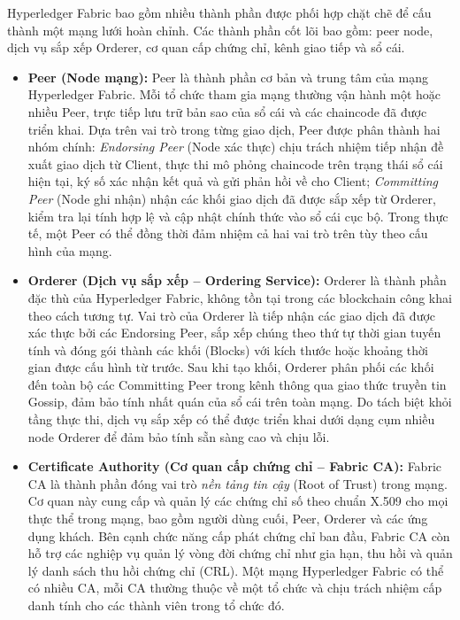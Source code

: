 Hyperledger Fabric bao gồm nhiều thành phần được phối hợp chặt chẽ để cấu thành một mạng lưới hoàn chỉnh. Các thành phần cốt lõi bao gồm: peer node, dịch vụ sắp xếp Orderer, cơ quan cấp chứng chỉ, kênh giao tiếp và sổ cái.

\begin{itemize}
    \item \textbf{Peer (Node mạng):} Peer là thành phần cơ bản và trung tâm của mạng Hyperledger Fabric. Mỗi tổ chức tham gia mạng thường vận hành một hoặc nhiều Peer, trực tiếp lưu trữ bản sao của sổ cái và các chaincode đã được triển khai. Dựa trên vai trò trong từng giao dịch, Peer được phân thành hai nhóm chính: \textit{Endorsing Peer} (Node xác thực) chịu trách nhiệm tiếp nhận đề xuất giao dịch từ Client, thực thi mô phỏng chaincode trên trạng thái sổ cái hiện tại, ký số xác nhận kết quả và gửi phản hồi về cho Client; \textit{Committing Peer} (Node ghi nhận) nhận các khối giao dịch đã được sắp xếp từ Orderer, kiểm tra lại tính hợp lệ và cập nhật chính thức vào sổ cái cục bộ. Trong thực tế, một Peer có thể đồng thời đảm nhiệm cả hai vai trò trên tùy theo cấu hình của mạng.

    \item \textbf{Orderer (Dịch vụ sắp xếp -- Ordering Service):} Orderer là thành phần đặc thù của Hyperledger Fabric, không tồn tại trong các blockchain công khai theo cách tương tự. Vai trò của Orderer là tiếp nhận các giao dịch đã được xác thực bởi các Endorsing Peer, sắp xếp chúng theo thứ tự thời gian tuyến tính và đóng gói thành các khối (Blocks) với kích thước hoặc khoảng thời gian được cấu hình từ trước. Sau khi tạo khối, Orderer phân phối các khối đến toàn bộ các Committing Peer trong kênh thông qua giao thức truyền tin Gossip, đảm bảo tính nhất quán của sổ cái trên toàn mạng. Do tách biệt khỏi tầng thực thi, dịch vụ sắp xếp có thể được triển khai dưới dạng cụm nhiều node Orderer để đảm bảo tính sẵn sàng cao và chịu lỗi.

    \item \textbf{Certificate Authority (Cơ quan cấp chứng chỉ -- Fabric CA):} Fabric CA là thành phần đóng vai trò \textit{nền tảng tin cậy} (Root of Trust) trong mạng. Cơ quan này cung cấp và quản lý các chứng chỉ số theo chuẩn X.509 cho mọi thực thể trong mạng, bao gồm người dùng cuối, Peer, Orderer và các ứng dụng khách. Bên cạnh chức năng cấp phát chứng chỉ ban đầu, Fabric CA còn hỗ trợ các nghiệp vụ quản lý vòng đời chứng chỉ như gia hạn, thu hồi và quản lý danh sách thu hồi chứng chỉ (CRL). Một mạng Hyperledger Fabric có thể có nhiều CA, mỗi CA thường thuộc về một tổ chức và chịu trách nhiệm cấp danh tính cho các thành viên trong tổ chức đó.


\end{itemize}
